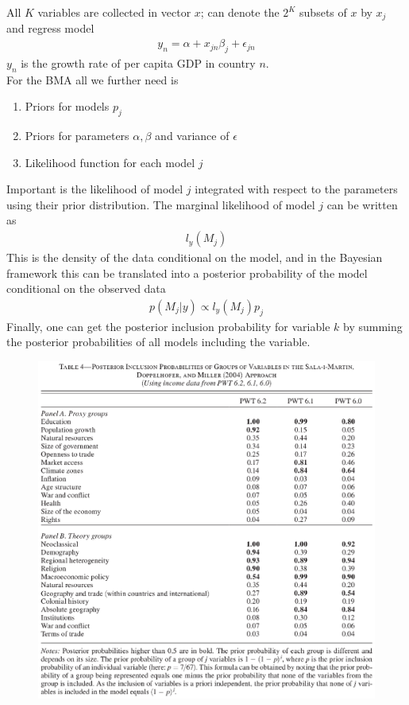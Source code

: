 \documentclass{beamer}
\begin{document}
\begin{frame}
  All $K$ variables are collected in vector $x$; can denote the $2^K$ subsets of $x$ by $x_j$ and regress model
  \begin{align}
    y_n=\alpha +x_{jn}\beta_j + \epsilon_{jn}
  \end{align}
  $y_n$ is the growth rate of per capita GDP in country $n$. \\
  For the BMA all we further need is 
  \begin{enumerate}
    \item Priors for models $p_j$
    \item Priors for parameters $\alpha,\beta$ and variance of $\epsilon$
    \item Likelihood function for each model $j$
  \end{enumerate}
\end{frame}

\begin{frame}
  Important is the likelihood of model $j$ integrated with respect to the parameters using their prior distribution.
  The marginal likelihood of model $j$ can be written as
  \begin{align}
    l_y(M_j)
  \end{align}
  This is the density of the data conditional on the model, and in the Bayesian framework this can be translated into a posterior probability of the model conditional on the observed data
  \begin{align}
    p(M_j|y) \propto l_y(M_j)p_j
  \end{align}
  \medskip
  Finally, one can get the posterior inclusion probability for variable $k$ by summing the posterior probabilities of all models including the variable.
\end{frame}


\begin{frame}
  \begin{figure}
    \includegraphics[scale=.5]{ciccone.eps}
  \end{figure}
\end{frame}


\end{document}
